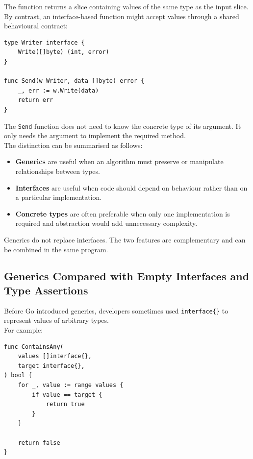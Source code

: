 The function returns a slice containing values of the same type as the input slice.\\

By contrast, an interface-based function might accept values through a shared behavioural contract:

\begin{lstlisting}
type Writer interface {
    Write([]byte) (int, error)
}

func Send(w Writer, data []byte) error {
    _, err := w.Write(data)
    return err
}
\end{lstlisting}

The \texttt{Send} function does not need to know the concrete type of its argument. It only needs the argument to implement the required method.\\

The distinction can be summarised as follows:

\begin{itemize}
    \item \textbf{Generics} are useful when an algorithm must preserve or manipulate relationships between types.
    \item \textbf{Interfaces} are useful when code should depend on behaviour rather than on a particular implementation.
    \item \textbf{Concrete types} are often preferable when only one implementation is required and abstraction would add unnecessary complexity.
\end{itemize}

Generics do not replace interfaces. The two features are complementary and can be combined in the same program.\\

\subsection{Generics Compared with Empty Interfaces and Type Assertions}

Before Go introduced generics, developers sometimes used \texttt{interface\{\}} to represent values of arbitrary types.\\

For example:

\begin{lstlisting}
func ContainsAny(
    values []interface{},
    target interface{},
) bool {
    for _, value := range values {
        if value == target {
            return true
        }
    }

    return false
}
\end{lstlisting}

